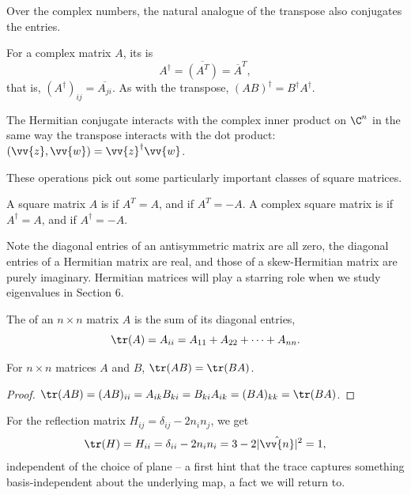 Over the complex numbers, the natural analogue of the transpose also conjugates the entries.

\begin{definition}
	For a complex matrix $A$, its  is
	$$
	A^\dagger = \overline{(A^T)} = \overline{A}^T,
	$$
	that is, $(A^\dagger)_{ij} = \overline{A_{ji}}$. As with the transpose, $(AB)^\dagger = B^\dagger A^\dagger$.
\end{definition}

The Hermitian conjugate interacts with the complex inner product on $\C^n$ in the same way the transpose interacts with the dot product: $(\vv{z}, \vv{w}) = \vv{z}^\dagger \vv{w}$.

These operations pick out some particularly important classes of square matrices.

\begin{definition}
	A square matrix $A$ is  if $A^T = A$, and  if $A^T = -A$. A complex square matrix is  if $A^\dagger = A$, and  if $A^\dagger = -A$.
\end{definition}

Note the diagonal entries of an antisymmetric matrix are all zero, the diagonal entries of a Hermitian matrix are real, and those of a skew-Hermitian matrix are purely imaginary. Hermitian matrices will play a starring role when we study eigenvalues in Section 6.

\begin{definition}[Trace]
	The  of an $n \times n$ matrix $A$ is the sum of its diagonal entries,
	$$
	\tr(A) = A_{ii} = A_{11} + A_{22} + \cdots + A_{nn}.
	$$
\end{definition}

\begin{proposition}
	For $n \times n$ matrices $A$ and $B$, $\tr(AB) = \tr(BA)$.
\end{proposition}
\begin{proof}
	$\tr(AB) = (AB)_{ii} = A_{ik}B_{ki} = B_{ki}A_{ik} = (BA)_{kk} = \tr(BA)$.
\end{proof}

\begin{example}
	For the reflection matrix $H_{ij} = \delta_{ij} - 2n_in_j$, we get
	$$
	\tr(H) = H_{ii} = \delta_{ii} - 2 n_i n_i = 3 - 2|\hat{\vv{n}}|^2 = 1,
	$$
	independent of the choice of plane -- a first hint that the trace captures something basis-independent about the underlying map, a fact we will return to.
\end{example}

